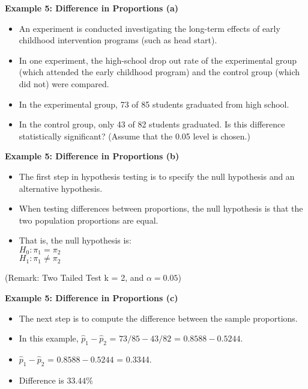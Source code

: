 

\noindent \textbf{Example 5: Difference in Proportions (a)}
\begin{itemize}
\item An experiment is conducted investigating the long-term effects of early childhood intervention programs (such as head start).
\item In one experiment, the high-school drop out rate of the experimental group (which attended the early childhood program)
 and the control group (which did not) were compared.
\item In the experimental group, 73 of 85 students graduated from high school. \item In the control group, only 43 of 82 students graduated.
Is this difference statistically significant? (Assume that the 0.05 level is chosen.) \end{itemize}



\noindent \textbf{Example 5: Difference in Proportions (b)}
\begin{itemize}
\item
The first step in hypothesis testing is to specify the null hypothesis and an alternative hypothesis.
\item When testing differences between proportions, the null hypothesis is that the two population proportions are equal.
\item That is, the null hypothesis is:\\
$H_0: \pi_1 = \pi_2$\\
$H_1: \pi_1 \neq \pi_2$\\
\end{itemize}
(Remark: Two Tailed Test k = 2, and $\alpha = 0.05$)


\noindent \textbf{Example 5: Difference in Proportions (c)}
\begin{itemize}
\item The next step is to compute the difference between the sample proportions.
\item In this example, $\hat{p}_1 - \hat{p}_2$ = $73/85 - 43/82$ = $0.8588 - 0.5244$.
\item $\hat{p}_1 - \hat{p}_2$ = $0.8588 - 0.5244$ = 0.3344.
\item Difference is $33.44\%$
\end{itemize}




